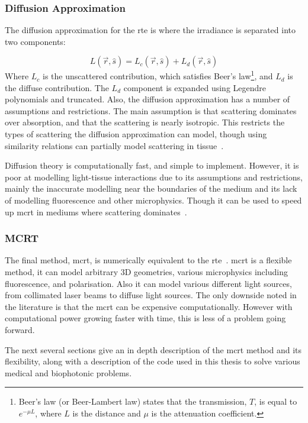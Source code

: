 \subsubsection*{Diffusion Approximation}
\label{sec:diffusionapprox}
The diffusion approximation for the \gls*{rte} is where the irradiance is separated into two components:

\begin{equation}
	L(\vec{r},\hat{s}) = L_c(\vec{r},\hat{s}) + L_d(\vec{r},\hat{s})
\end{equation}
Where $L_c$ is the unscattered contribution, which satisfies Beer's law\footnote{Beer's law (or Beer-Lambert law) states that the transmission, $T$, is equal to $e^{-\mu L}$, where $L$ is the distance and $\mu$ is the attenuation coefficient.}, and $L_d$ is the diffuse contribution. The $L_d$ component is expanded using Legendre polynomials and truncated. 
Also, the diffusion approximation has a number of assumptions and restrictions. The main assumption is that scattering dominates over absorption, and that the scattering is nearly isotropic. This restricts the types of scattering the diffusion approximation can model, though using similarity relations can partially model scattering in tissue~\cite{graaff1993similarity,yoon1989accuracies}.

Diffusion theory is computationally fast, and simple to implement. However, it is poor at modelling light-tissue interactions due to its assumptions and restrictions, mainly the inaccurate modelling near the boundaries of the medium and its lack of modelling fluorescence and other microphysics. Though it can be used to speed up \gls*{mcrt} in mediums where scattering dominates~\cite{robitaille2010modified,min2009radiative}.

\subsubsection*{MCRT}
The final method, \gls*{mcrt}, is numerically equivalent to the \gls*{rte}~\cite{wang2012biomedical}. \gls*{mcrt} is a flexible method, it can model arbitrary 3D geometries, various microphysics including fluorescence, and polarisation. Also it can model various different light sources, from collimated laser beams to diffuse light sources. The only downside noted in the literature is that the \gls*{mcrt} can be expensive computationally. However with computational power growing faster with time, this is less of a problem going forward. 

The next several sections give an in depth description of the \gls*{mcrt} method and its flexibility, along with a description of the code used in this thesis to solve various medical and biophotonic problems.

